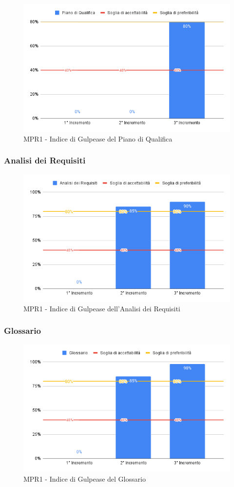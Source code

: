 \begin{figure}[H]
	\centering
	\includegraphics[scale = 0.6]{sezioni/Images/PdQ.png}
	\caption{MPR1 - Indice di Gulpease del Piano di Qualifica}
\end{figure}

\subsubsection{Analisi dei Requisiti}

\begin{figure}[H]
	\centering
	\includegraphics[scale = 0.6]{sezioni/Images/AdR.png}
	\caption{MPR1 - Indice di Gulpease dell'Analisi dei Requisiti}
\end{figure}

\subsubsection{Glossario}

\begin{figure}[H]
	\centering
	\includegraphics[scale = 0.6]{sezioni/Images/Glossario.png}
	\caption{MPR1 - Indice di Gulpease del Glossario}
\end{figure}